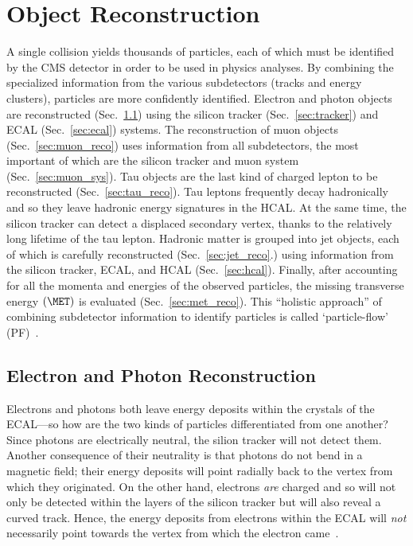 \section{Object Reconstruction}
\label{sec:obj_reco}
A single \pp collision yields thousands of particles, each of which must be identified by the CMS detector in order to be used in physics analyses.
By combining the specialized information from the various subdetectors (\eg tracks and energy clusters), particles are more confidently identified.
Electron and photon objects are reconstructed (Sec.~\ref{sec:egamma_reco}) using the silicon tracker (Sec.~\ref{sec:tracker}) and ECAL (Sec.~\ref{sec:ecal}) systems.
The reconstruction of muon objects (Sec.~\ref{sec:muon_reco}) uses information from all subdetectors, the most important of which are the silicon tracker and muon system (Sec.~\ref{sec:muon_sys}).
Tau objects are the last kind of charged lepton to be reconstructed (Sec.~\ref{sec:tau_reco}).
Tau leptons frequently decay hadronically and so they leave hadronic energy signatures in the HCAL.
At the same time, the silicon tracker can detect a displaced secondary vertex, thanks to the relatively long lifetime of the tau lepton.
Hadronic matter is grouped into jet objects, each of which is carefully reconstructed (Sec.~\ref{sec:jet_reco}.) using information from the silicon tracker, ECAL, and HCAL (Sec.~\ref{sec:hcal}).
Finally, after accounting for all the momenta and energies of the observed particles, the missing transverse energy $\left( \MET \right)$ is evaluated (Sec.~\ref{sec:met_reco}).
This ``holistic approach'' of combining subdetector information to identify particles is called `particle-flow' (PF)~\cite{particle_flow}.

\subsection{Electron and Photon Reconstruction}
\label{sec:egamma_reco}
Electrons and photons both leave energy deposits within the crystals of the ECAL---so how are the two kinds of particles differentiated from one another?
Since photons are electrically neutral, the silion tracker will not detect them.
Another consequence of their neutrality is that photons do not bend in a magnetic field;
their energy deposits will point radially back to the vertex from which they originated.
On the other hand, electrons \emph{are} charged and so will not only be detected within the layers of the silicon tracker but will also reveal a curved track.
Hence, the energy deposits from electrons within the ECAL will \emph{not} necessarily point towards the vertex from which the electron came~\cite{Ereco_performance_2015}.

